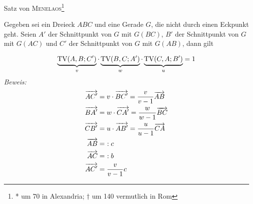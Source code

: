 \begin{mysatz}
    Satz von \textsc{Menelaos}\footnote{* um 70 in Alexandria; $\dagger$ um 140 vermutlich in Rom}

    \begin{minipage}{0.45\textwidth}
        Gegeben sei ein Dreieck $ABC$ und eine Gerade $G$, die nicht durch einen Eckpunkt geht. Seien $A'$ der Schnittpunkt von $G$ mit $G(BC)$, $B'$ der Schnittpunkt von $G$ mit $G(AC)$ und $C'$ der Schnittpunkt von $G$ mit $G(AB)$, dann gilt
    \end{minipage}
    \begin{minipage}{0.55\textwidth}
        \begin{center}
        \end{center}
    \end{minipage}
    \begin{align*}
        \underbrace{\text{TV}(A,B;C')}_{v}
        \cdot
        \underbrace{\text{TV}(B,C;A')}_{w}
        \cdot
        \underbrace{\text{TV}(C,A;B')}_{u}
        = 1
    \end{align*}
    \textit{Beweis:}
    \begin{align*}
        \ora{AC'} & = v \cdot \ora{BC'} = \frac{v}{v-1} \ora{AB}\\
        \ora{BA'} & = w \cdot \ora{CA'} = \frac{w}{w-1} \ora{BC}\\
        \ora{CB'} & = u \cdot \ora{AB'} = \frac{u}{u-1} \ora{CA}\\
        \ora{AB} & =\ : c\\
        \ora{AC} & =\ : b\\
        \ora{AC'} & = \frac{v}{v-1} c\\

\end{align*}
\end{mysatz}
